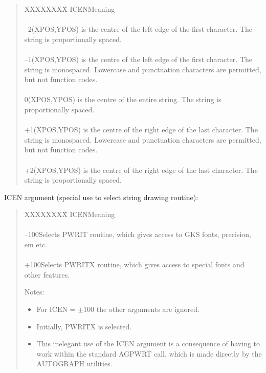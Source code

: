 \begin{quote}
\begin{tabbing}
XXXXXXXX\=\kill
ICEN\>Meaning\\
\\
--2\>(XPOS,YPOS) is the centre of the left edge of the first character.  The\\
\>string is proportionally spaced.\\
\\
--1\>(XPOS,YPOS) is the centre of the left edge of the first character.  The\\
\>string is monospaced.  Lowercase and punctuation characters are permitted,\\
\>but not function codes.\\
\\
0\>(XPOS,YPOS) is the centre of the entire string.  The string is\\
\>proportionally spaced.\\
\\
+1\>(XPOS,YPOS) is the centre of the right edge of the last character.  The\\
\>string is monospaced.  Lowercase and punctuation characters are permitted,\\
\>but not function codes.\\
\\
+2\>(XPOS,YPOS) is the centre of the right edge of the last character.  The\\
\>string is proportionally spaced.\\
\end{tabbing}
\end{quote}

ICEN argument (special use to select string drawing routine):

\begin{quote}
\begin{tabbing}
XXXXXXXX\=\kill
ICEN\>Meaning\\
\\
--100\>Selects PWRIT routine, which gives access to GKS fonts, precision, 
{em etc.}\\
\\
+100\>Selects PWRITX routine, which gives access to special fonts and other
features.
\end{tabbing}

Notes:

\begin{itemize}
\item For ICEN = $\pm100$ the other arguments are ignored.
\item Initially, PWRITX is selected.
\item This inelegant use of the ICEN argument is a consequence
of having to work within the standard AGPWRT call, which
is made directly by the AUTOGRAPH utilities.
\end{itemize}
\end{quote}

